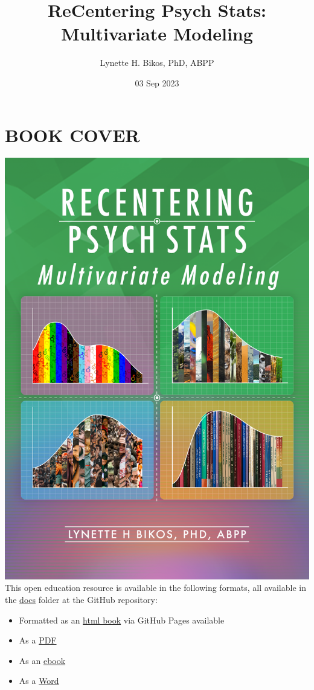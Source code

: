 \documentclass[
  11pt,
]{book}
\title{ReCentering Psych Stats: Multivariate Modeling}
\author{Lynette H. Bikos, PhD, ABPP}
\date{03 Sep 2023}
\providecommand{\tightlist}{%
  \setlength{\itemsep}{0pt}\setlength{\parskip}{0pt}}
\begin{document}
\maketitle

{
\hypersetup{linkcolor=}
\setcounter{tocdepth}{3}
\tableofcontents
}
\hypertarget{book-cover}{%
\chapter*{BOOK COVER}\label{book-cover}}


\includegraphics{images/ReC_multivariate_bkcvr.png} This open education resource is available in the following formats, all available in the \href{https://github.com/lhbikos/ReC_MultivModel/tree/main/docs}{docs} folder at the GitHub repository:

\begin{itemize}
\tightlist
\item
  Formatted as an \href{https://lhbikos.github.io/ReC_MultivModel/}{html book} via GitHub Pages available
\item
  As a \href{https://github.com/lhbikos/ReC_MultivModel/blob/main/docs/ReC_MultMod.pdf}{PDF}
\item
  As an \href{https://github.com/lhbikos/ReC_MultivModel/blob/main/docs/ReC_MultMod.epub}{ebook}
\item
  As a \href{https://github.com/lhbikos/ReC_MultivModel/blob/main/docs/ReC_MultMod.docx}{Word}
\end{itemize}
\end{document}

